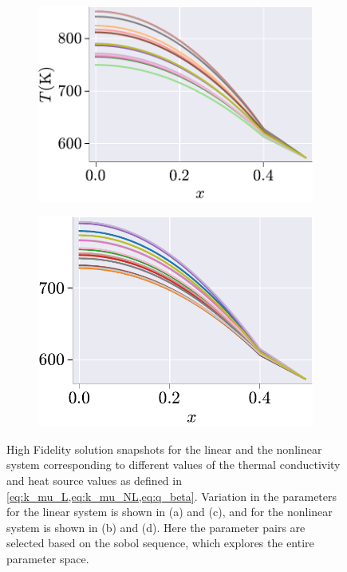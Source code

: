 \documentclass[11pt]{article}
\begin{document}
\begin{figure}[t]
\begin{subfigure}[b]{0.45\linewidth}
\centering
\includegraphics[width=\linewidth]{linear_T_FOM.pdf}
\caption{}
\label{fig:HFS_HC_c}
\end{subfigure}
\begin{subfigure}[b]{0.45\linewidth}
\centering
\includegraphics[width=0.92\linewidth]{nonlinear_T_FOM.pdf}
\caption{}
\label{fig:HFS_HC_d}
\end{subfigure}
\caption{High Fidelity solution snapshots for the linear and the nonlinear system corresponding to different values of the thermal conductivity and heat source values as defined in \cref{eq:k_mu_L,eq:k_mu_NL,eq:q_beta}.
Variation in the parameters for the linear system is shown in (a) and (c), and for the nonlinear system is shown in (b) and (d).
Here the parameter pairs are selected based on the sobol sequence, which explores the entire parameter space.}
\label{fig:HFS_HC}
\end{figure}
\end{document}
